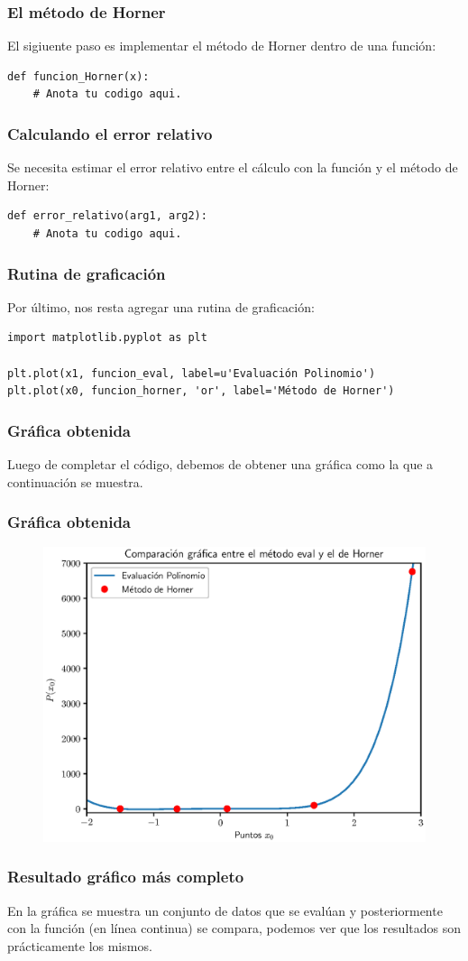 \documentclass[12pt]{beamer}
\begin{document}
\begin{frame}[fragile]
\frametitle{El método de Horner}
El sigiuente paso es implementar el método de Horner dentro de una función:
\begin{lstlisting}[caption=El método de Horner]
def funcion_Horner(x):
    # Anota tu codigo aqui.
\end{lstlisting}
\end{frame}
\begin{frame}[fragile]
\frametitle{Calculando el error relativo}
Se necesita estimar el error relativo entre el cálculo con la función  y el método de Horner:
\begin{lstlisting}[caption=Función para el error relativo]
def error_relativo(arg1, arg2):
    # Anota tu codigo aqui.
\end{lstlisting}
\end{frame}
\begin{frame}[fragile]
\frametitle{Rutina de graficación}
Por último, nos resta agregar una rutina de graficación:
\begin{lstlisting}[caption=Rutina de graficación]
import matplotlib.pyplot as plt

plt.plot(x1, funcion_eval, label=u'Evaluación Polinomio')
plt.plot(x0, funcion_horner, 'or', label='Método de Horner')
\end{lstlisting}
\end{frame}
\begin{frame}
\frametitle{Gráfica obtenida}
Luego de completar el código, debemos de obtener una gráfica como la que a continuación se muestra.
\end{frame}
\begin{frame}[fragile]
\frametitle{Gráfica obtenida}
\begin{figure}
    \centering
    \includegraphics[scale=0.6]{Imagenes/Plot_Metodo_Horner_01.eps} 
\end{figure}
\end{frame}
\begin{frame}[fragile]
\frametitle{Resultado gráfico más completo}
En la gráfica se muestra un conjunto de datos que se evalúan y posteriormente con la función (en línea continua) se compara, podemos ver que los resultados son prácticamente los mismos.
\end{frame}
\end{document}
